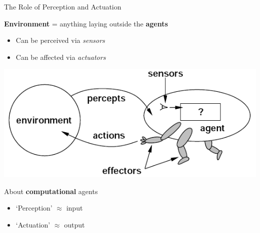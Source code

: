\documentclass[presentation]{beamer}\mode<presentation>{\usetheme{AMSBolognaFC}}
\begin{document}
\begin{frame}{The Role of Perception and Actuation}
    \begin{block}{\textbf{Environment} = anything laying outside the \textbf{agents}}
        \begin{itemize}
            \item
              Can be \alert{perceived} via \emph{sensors}
            \item
              Can be \alert{affected} via \emph{actuators}
        \end{itemize}
    \end{block}

    \begin{center}
        \includegraphics[width=.5\linewidth]{figures/agent-environment.png}
    \end{center}

    \begin{alertblock}{About \textbf{computational} agents}
        \begin{itemize}
            \item `Perception' $\approx$ \alert{input}
            \item `Actuation' $\approx$ \alert{output}
        \end{itemize}
    \end{alertblock}
\end{frame}
\end{document}
